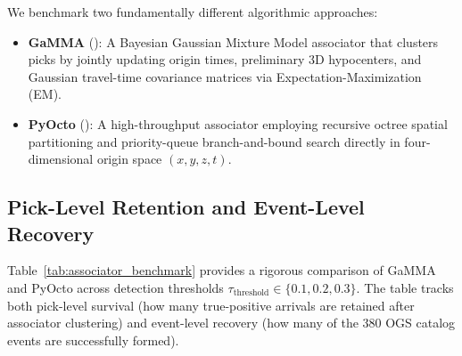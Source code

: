 We benchmark two fundamentally different algorithmic approaches:
\begin{itemize}
  \item \textbf{GaMMA} (\cite{GaMMA}): A Bayesian Gaussian Mixture Model associator that clusters picks by jointly updating origin times, preliminary 3D hypocenters, and Gaussian travel-time covariance matrices via Expectation-Maximization (\ac{EM}).
  \item \textbf{PyOcto} (\cite{PyOcto}): A high-throughput associator employing recursive octree spatial partitioning and priority-queue branch-and-bound search directly in four-dimensional origin space $(x, y, z, t)$.
\end{itemize}

\subsection{Pick-Level Retention and Event-Level Recovery}
\label{subsec:associator_pick_event_performance}

Table~\ref{tab:associator_benchmark} provides a rigorous comparison of GaMMA and PyOcto across detection thresholds $\tau_{\mathrm{threshold}} \in \{0.1, 0.2, 0.3\}$. The table tracks both pick-level survival (how many true-positive arrivals are retained after associator clustering) and event-level recovery (how many of the 380 OGS catalog events are successfully formed).

